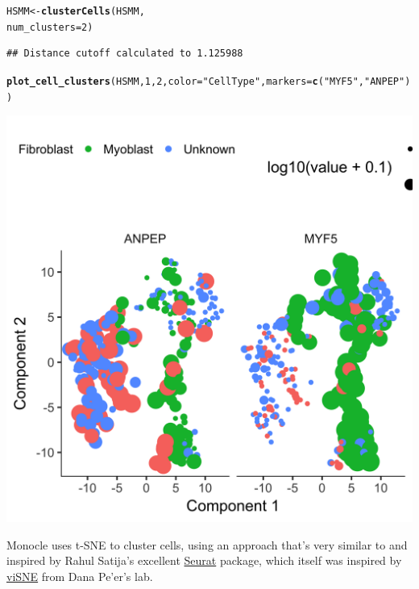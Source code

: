 \documentclass[10pt,oneside]{article}\usepackage[]{graphicx}\usepackage[]{color}
\makeatletter
\def\maxwidth{ %
  \ifdim\Gin@nat@width>\linewidth
    \linewidth
  \else
    \Gin@nat@width
  \fi
}
\newcommand{\hlnum}[1]{\textcolor[rgb]{0.686,0.059,0.569}{#1}}%
\newcommand{\hlstr}[1]{\textcolor[rgb]{0.192,0.494,0.8}{#1}}%
\newcommand{\hlstd}[1]{\textcolor[rgb]{0.345,0.345,0.345}{#1}}%
\newcommand{\hlkwb}[1]{\textcolor[rgb]{0.69,0.353,0.396}{#1}}%
\newcommand{\hlkwc}[1]{\textcolor[rgb]{0.333,0.667,0.333}{#1}}%
\newcommand{\hlkwd}[1]{\textcolor[rgb]{0.737,0.353,0.396}{\textbf{#1}}}%
\newenvironment{kframe}{%
 \def\at@end@of@kframe{}%
 \ifinner\ifhmode%
  \def\at@end@of@kframe{\end{minipage}}%
  \begin{minipage}{\columnwidth}%
 \fi\fi%
 \def\FrameCommand##1{\hskip\@totalleftmargin \hskip-\fboxsep
 \colorbox{shadecolor}{##1}\hskip-\fboxsep
     \hskip-\linewidth \hskip-\@totalleftmargin \hskip\columnwidth}%
 \MakeFramed {\advance\hsize-\width
   \@totalleftmargin\z@ \linewidth\hsize
   \@setminipage}}%
 {\par\unskip\endMakeFramed%
 \at@end@of@kframe}
\newenvironment{knitrout}{}{} %
\makeatother
\begin{document}
\begin{knitrout}
\begin{kframe}
{\ttfamily\noindent\itshape\color{messagecolor}{\#\# Reduce dimension by tSNE ...}}\begin{alltt}
\hlstd{HSMM} \hlkwb{<-} \hlkwd{clusterCells}\hlstd{(HSMM,}
                     \hlkwc{num_clusters}\hlstd{=}\hlnum{2}\hlstd{)}
\end{alltt}
\begin{verbatim}
## Distance cutoff calculated to 1.125988
\end{verbatim}


{\ttfamily\noindent\itshape\color{messagecolor}{\#\# the length of the distance: 34191}}\begin{alltt}
\hlkwd{plot_cell_clusters}\hlstd{(HSMM,} \hlnum{1}\hlstd{,} \hlnum{2}\hlstd{,} \hlkwc{color}\hlstd{=}\hlstr{"CellType"}\hlstd{,} \hlkwc{markers}\hlstd{=}\hlkwd{c}\hlstd{(}\hlstr{"MYF5"}\hlstd{,} \hlstr{"ANPEP"}\hlstd{))}
\end{alltt}
\end{kframe}

{\centering \includegraphics[width=\maxwidth]{figure/cluster_cells_unsup_no_covariate-2} 

}



\end{knitrout}

Monocle uses t-SNE \cite{Maaten2008-om} to cluster cells, using an approach that's very similar to and inspired by Rahul Satija's excellent \href{http://satijalab.org/seurat/}{Seurat} package, which itself was inspired by \href{https://www.c2b2.columbia.edu/danapeerlab/html/cyt.html}{viSNE} from Dana Pe'er's lab.
\end{document}
